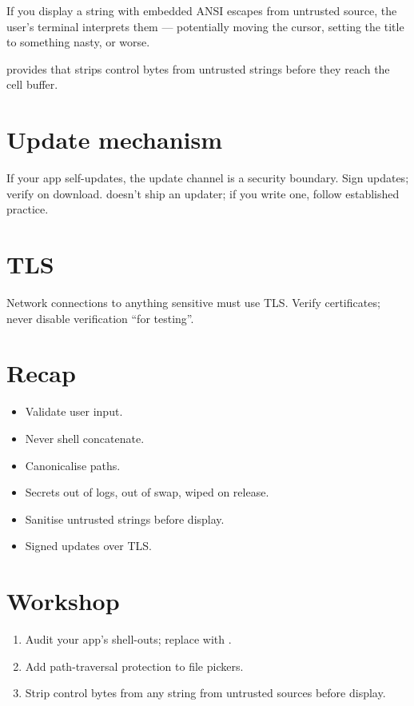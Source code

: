 If you display a string with embedded ANSI escapes from
untrusted source, the user's terminal interprets them ---
potentially moving the cursor, setting the title to
something nasty, or worse.

\maya{} provides  that strips
control bytes from untrusted strings before they reach
the cell buffer.

\section{Update mechanism}

If your app self-updates, the update channel is a security
boundary. Sign updates; verify on download. \maya{}
doesn't ship an updater; if you write one, follow
established practice.

\section{TLS}

Network connections to anything sensitive must use TLS.
Verify certificates; never disable verification ``for
testing''.

\section{Recap}

\begin{recap}
\begin{itemize}[leftmargin=*]
  \item Validate user input.
  \item Never shell concatenate.
  \item Canonicalise paths.
  \item Secrets out of logs, out of swap, wiped on release.
  \item Sanitise untrusted strings before display.
  \item Signed updates over TLS.
\end{itemize}
\end{recap}

\section*{Workshop}

\begin{enumerate}[leftmargin=*]
  \item Audit your app's shell-outs; replace with
    .
  \item Add path-traversal protection to file pickers.
  \item Strip control bytes from any string from
    untrusted sources before display.
\end{enumerate}
